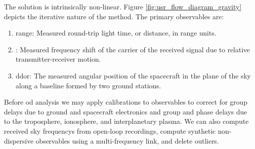 \documentclass{article}
\begin{document}
                    The solution is intrinsically non-linear.
                    Figure \ref{fig:usr_flow_diagram_gravity}
                    depicts the iterative nature of the method.
                    The primary observables are:
                    \begin{enumerate}
                        \item \Gls{range}: Measured round-trip
                              light time, or distance,
                              in range units.
                        \item {}:
                              Measured frequency shift of the
                              carrier of the received signal due to
                              relative transmitter-receiver motion.
                        \item \gls{ddor}: The measured angular
                              position of the spacecraft in the plane
                              of the sky along a baseline formed by
                              two ground stations.
                    \end{enumerate}
                    Before \gls{od} analysis we may apply
                    calibrations to observables to correct for
                    \glspl{group delay} due to ground and spacecraft
                    electronics and group and \glspl{phase delay}
                    due to the \gls{troposphere}, \gls{ionosphere},
                    and \gls{interplanetary plasma}.
                    We can also compute received
                    \glspl{sky frequency} from \gls{open-loop}
                    recordings, compute synthetic non-dispersive
                    observables using a multi-frequency link,
                    and delete \glspl{outlier}.
\end{document}
